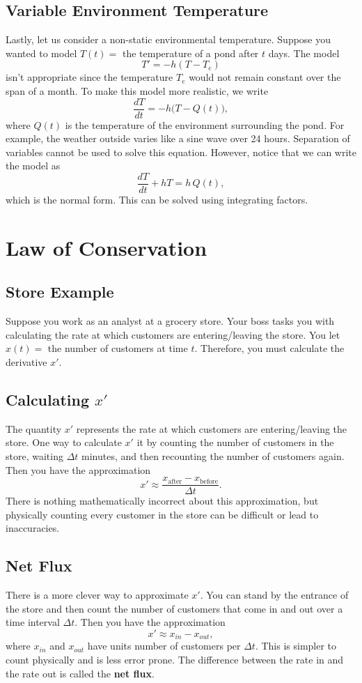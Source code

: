 \documentclass[10pt,letterpaper]{article}
\begin{document}
\subsection{Variable Environment Temperature}
Lastly, let us consider a non-static environmental temperature. Suppose you wanted to model $T(t)=$ the temperature of a pond after $t$ days. The model
$$
    T'=-h(T-T_e)
$$
isn't appropriate since the temperature $T_e$ would not remain constant over the span of a month. To make this model more realistic, we write
\[
\frac{dT}{dt}=-h\bigl(T-Q(t)\bigr),
\]
where $Q(t)$ is the temperature of the environment surrounding the pond. For example, the weather outside varies like a sine wave over 24 hours. Separation of variables cannot be used to solve this equation. However, notice that we can write the model as 
$$
\frac{dT}{dt} + hT=h\,Q(t),
$$
which is the normal form. This can be solved using integrating factors.

\section{Law of Conservation}

\subsection{Store Example}
Suppose you work as an analyst at a grocery store. Your boss tasks you with calculating the rate at which customers are entering/leaving the store. You let $x(t)=$ the number of customers at time $t$. Therefore, you must calculate the derivative $x'$.

\subsection{Calculating $x'$}
The quantity $x'$ represents the rate at which customers are entering/leaving the store. One way to calculate $x'$ it by counting the number of customers in the store, waiting $\Delta t$ minutes, and then recounting the number of customers again. Then you have the approximation
$$
x' \approx \frac{x_{\text{after}}-x_{\text{before}} }{\Delta t}.
$$
There is nothing mathematically incorrect about this approximation, but physically counting every customer in the store can be difficult or lead to inaccuracies. 

\subsection{Net Flux}
There is a more clever way to approximate $x'$. You can stand by the entrance of the store and then count the number of customers that come in and out over a time interval $\Delta t$. Then you have the approximation 
$$
x' \approx   x_{in} -x_{out},
$$
where $x_{in}$ and $x_{out}$ have units number of customers per $\Delta t$. This is simpler to count physically and is less error prone. The difference between the rate in and the rate out is called the \textbf{net flux}. 
\end{document}
